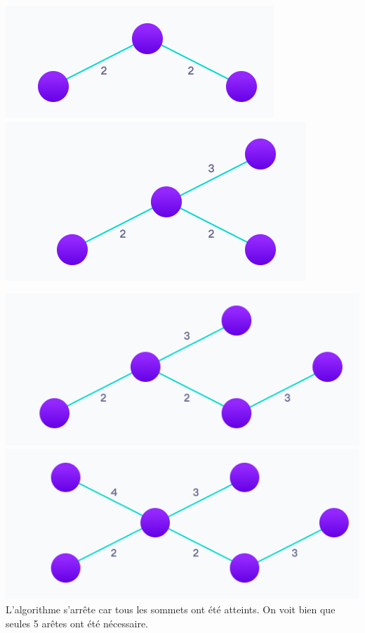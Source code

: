 \begin{Exercice}[5 minutes]
\begin{solution}
        \includegraphics[]{K2.PNG}\\
        \includegraphics[]{K3.PNG}\\
    \end{solution}
    \begin{solution}
        \includegraphics[]{K4.PNG}\\
        \includegraphics[]{K5.PNG}\\
        L'algorithme s'arrête car tous les sommets ont été atteints. On voit bien que seules 5 arêtes ont été nécessaire.
    \end{solution}
\end{Exercice}
